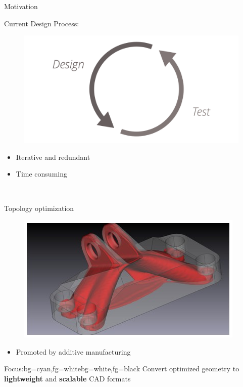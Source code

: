 \begin{frame}{Motivation}
	\begin{multicols}{2}
		Current Design Process:
		\begin{figure}
			\includegraphics[width=0.8\linewidth]{Pictures/Motivation/DesignTest.png}
		\end{figure}
		\begin{itemize}
			\item Iterative and redundant
			\item Time consuming
		\end{itemize}~\\

		\vfill
		\columnbreak
		\pause

		Topology optimization
		\begin{figure}
			\includegraphics[width=0.9\linewidth]{Pictures/ProposalGEBracket.png}
		\end{figure}
		\begin{itemize}
			\item Promoted by additive manufacturing
		\end{itemize}

		\pause
	\end{multicols}
	\begin{variableblock}{Focus:}{bg=cyan,fg=white}{bg=white,fg=black}
	{
	Convert optimized geometry to \textbf{lightweight} and \textbf{scalable} CAD formats
	}
	\end{variableblock}
\end{frame}

